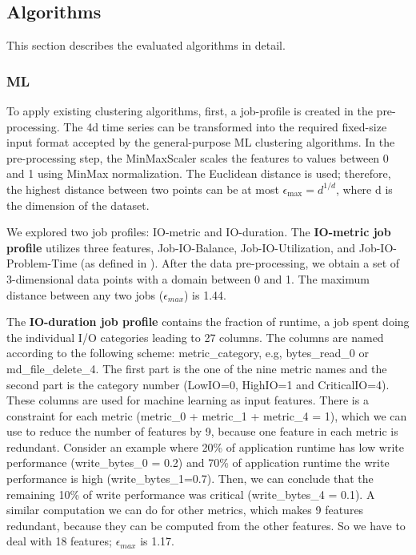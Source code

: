 \documentclass{jhps}
\begin{document}
\subsection{Algorithms}
This section describes the evaluated algorithms in detail.

\subsubsection{ML}

To apply existing clustering algorithms, first, a job-profile is created in the pre-processing.
The 4d time series can be transformed into the required fixed-size input format accepted by the general-purpose ML clustering algorithms.
In the pre-processing step, the MinMaxScaler scales the features to values between 0 and 1 using MinMax normalization.
The Euclidean distance is used; therefore, the highest distance between two points can be at most \(\epsilon_\text{max} = d^{1/d}\), where d is the dimension of the dataset.

We explored two job profiles: IO-metric and IO-duration.
The \textbf{IO-metric job profile} utilizes three features, Job-IO-Balance, Job-IO-Utilization, and Job-IO-Problem-Time (as defined in \cite{iocats2020}).
After the data pre-processing, we obtain a set of 3-dimensional data points with a domain between 0 and 1.
The maximum distance between any two jobs ($\epsilon_{max}$) is 1.44.

The \textbf{IO-duration job profile} contains the fraction of runtime, a job spent doing the individual I/O categories leading to 27 columns.
The columns are named according to the following scheme: metric\_category, e.g, bytes\_read\_0 or md\_file\_delete\_4.
The first part is the one of the nine metric names and the second part is the category number (LowIO=0, HighIO=1 and CriticalIO=4).
These columns are used for machine learning as input features.
There is a constraint for each metric (metric\_0 + metric\_1 + metric\_4 = 1), which we can use to reduce the number of features by 9, because one feature in each metric is redundant.
Consider an example where 20\% of application runtime has low write performance (write\_bytes\_0 = 0.2) and 70\% of application runtime the write performance is high (write\_bytes\_1=0.7).
Then, we can conclude that the remaining 10\% of write performance was critical (write\_bytes\_4 = 0.1).
A similar computation we can do for other metrics, which makes 9 features redundant, because they can be computed from the other features.
So we have to deal with 18 features; $\epsilon_{max}$ is 1.17.
\end{document}

